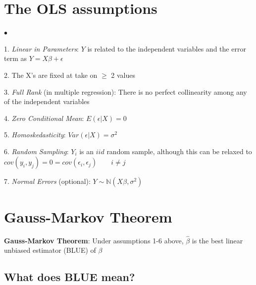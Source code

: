 \documentclass[12pt]{article}
\newcommand{\field}[1]{\mathbb{#1}}
\begin{document}
\section{The OLS assumptions}
\begin{list}{$\bullet$}{}

\item[1.] \emph{Linear in Parameters}: $Y$ is related to the independent variables and the error term as $Y = X\beta + \epsilon$

\item[2.] The X's are fixed at take on $\ge$ 2 values
\item[3.] \emph{Full Rank} (in multiple regression): There is no perfect collinearity among any of the independent variables

\item[4.] \emph{Zero Conditional Mean}: $E(\epsilon | X ) = 0$

\item[5.] \emph{Homoskedasticity}: $Var(\epsilon | X) = \sigma^{2}$

% 
\item[6.] \emph{Random Sampling}: $Y_{i}$ is an $ iid$ random sample, although this can be relaxed to $cov(y_{i}, y_{j}) = 0 = cov(\epsilon_{i}, \epsilon_{j}) \qquad i \ne j$

\item[7.] \emph{Normal Errors} (optional): $Y \sim \field{N}( X\beta, \sigma^2 ) $
\end{list}

\section{Gauss-Markov Theorem}

\textbf{Gauss-Markov Theorem}: Under assumptions 1-6 above, $\hat{\beta}$ is the best linear unbiased estimator (BLUE) of $\beta$

\subsection{What does BLUE mean?}
\end{document}

